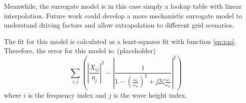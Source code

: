 \documentclass[10pt,twoside]{article}
\begin{document}
    

Meanwhile, the surrogate model is in this case simply a lookup table with linear interpolation.
Future work could develop a more mechanistic surrogate model to understand driving factors and allow extrapolation to different grid scenarios.


The fit for this model is calculated as a least-squares fit with function \eqref{eq:rao}. Therefore, the error for this model is:
(placeholder)
\begin{equation}
    \sum_{i,j}^{} \left(\left|\frac{X_{ij}}{\eta_j}\right|^{2}-\left|\frac{1}{1-\left(\frac{\omega_i}{\omega_n}\right)^2 + j 2 \zeta \frac{\omega_i}{\omega_n}}\right|^{2}\right)
\end{equation}
where $i$ is the frequency index and $j$ is the wave height index.

\end{document}
